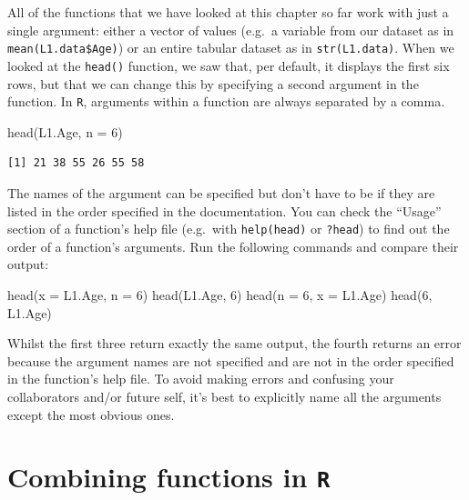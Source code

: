 \documentclass[
  letterpaper,
  DIV=11,
  numbers=noendperiod]{scrreprt}
\newenvironment{Shaded}{\begin{snugshade}}{\end{snugshade}}
\newcommand{\AttributeTok}[1]{\textcolor[rgb]{0.40,0.45,0.13}{#1}}
\newcommand{\DecValTok}[1]{\textcolor[rgb]{0.68,0.00,0.00}{#1}}
\newcommand{\FunctionTok}[1]{\textcolor[rgb]{0.28,0.35,0.67}{#1}}
\newcommand{\NormalTok}[1]{\textcolor[rgb]{0.00,0.23,0.31}{#1}}
\begin{document}
All of the functions that we have looked at this chapter so far work
with just a single argument: either a vector of values (e.g.~a variable
from our dataset as in \texttt{mean(L1.data\$Age)}) or an entire tabular
dataset as in \texttt{str(L1.data)}. When we looked at the
\texttt{head()} function, we saw that, per default, it displays the
first six rows, but that we can change this by specifying a second
argument in the function. In \texttt{R}, arguments within a function are
always separated by a comma.

\begin{Shaded}
\begin{Highlighting}[]
\FunctionTok{head}\NormalTok{(L1.Age, }\AttributeTok{n =} \DecValTok{6}\NormalTok{)}
\end{Highlighting}
\end{Shaded}

\begin{verbatim}
[1] 21 38 55 26 55 58
\end{verbatim}

The names of the argument can be specified but don't have to be if they
are listed in the order specified in the documentation. You can check
the ``Usage'' section of a function's help file (e.g.~with
\texttt{help(head)} or \texttt{?head}) to find out the order of a
function's arguments. Run the following commands and compare their
output:

\begin{Shaded}
\begin{Highlighting}[]
\FunctionTok{head}\NormalTok{(}\AttributeTok{x =}\NormalTok{ L1.Age, }\AttributeTok{n =} \DecValTok{6}\NormalTok{)}
\FunctionTok{head}\NormalTok{(L1.Age, }\DecValTok{6}\NormalTok{)}
\FunctionTok{head}\NormalTok{(}\AttributeTok{n =} \DecValTok{6}\NormalTok{, }\AttributeTok{x =}\NormalTok{ L1.Age)}
\FunctionTok{head}\NormalTok{(}\DecValTok{6}\NormalTok{, L1.Age)}
\end{Highlighting}
\end{Shaded}

Whilst the first three return exactly the same output, the fourth
returns an error because the argument names are not specified and are
not in the order specified in the function's help file. To avoid making
errors and confusing your collaborators and/or future self, it's best to
explicitly name all the arguments except the most obvious ones.

\section{\texorpdfstring{Combining functions in
\texttt{R}}{Combining functions in R}}\label{combining-functions-in-r}
\end{document}
